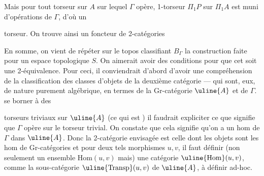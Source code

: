 Mais pour tout torseur  sur \(A\) sur lequel \(\Gamma\) opère,   1-torseur  \(\Pi_1P\) sur \(\Pi_1A\)  est muni d'opérations de \(\Gamma\), d'où un



 torseur. On trouve ainsi un foncteur de 2-catégories

En somme, on vient de répéter sur le topos classifiant \(B_\Gamma\) la construction faite  pour un espace topologique \(S\). On aimerait avoir  des conditions pour que cet   soit une 2-équivalence. Pour ceci, il conviendrait d'abord d'avoir une compréhension de la classification des classes  d'objets de la deuxième catégorie --- qui sont, eux, de nature purement algébrique, en termes de la Gr-catégorie \(\uline{A}\) et de \(\Gamma\).  se borner à des



torseurs triviaux sur \(\uline{A}\) (ce qui est ) il faudrait expliciter ce que signifie que \(\Gamma\) opère sur le torseur trivial. On constate que cela signifie qu'on a un hom  de  \(\Gamma\) dans \(\uline{A}\). Donc la 2-catégorie envisagée est celle dont les objets sont les hom de Gr-catégories
et pour deux tels morphismes \(u,v\), il faut définir (non seulement un ensemble \(\mathrm{Hom}(u,v)\) mais) une catégorie \(\uline{\mathrm{Hom}}(u,v)\), comme la sous-catégorie \(\uline{\mathrm{Transp}}(u,v)\) de \(\uline{A}\), à définir ad-hoc.

